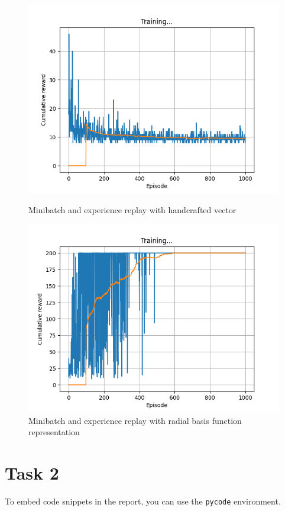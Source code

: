\documentclass[12pt]{article}
\begin{document}
\begin{figure}[H]
    \centering
   \begin{minipage}{0.48\textwidth}
     \centering
     \includegraphics[width=0.9\linewidth]{exercise-4/plots/task-2a.png}
     \caption{Minibatch and experience replay with handcrafted vector}
     \label{fig:task-2-1}
   \end{minipage}\hfill
   \begin{minipage}{0.48\textwidth}
     \centering
     \includegraphics[width=0.9\linewidth]{exercise-4/plots/task-2b.png}
     \caption{Minibatch and experience replay with radial basis function representation}
     \label{fig:task-2-2}
   \end{minipage}
\end{figure}

\section{Task 2}
To embed code snippets in the report, you can use the \texttt{pycode} environment.
\end{document}
